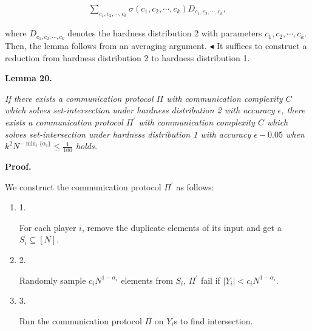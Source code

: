 \[\begin{gathered}
\sum_{c_{1},c_{2},\cdots,c_{k}}\sigma(c_{1},c_{2},\cdots,c_{k})D_{c_{1},c_{2},\cdots,c_{k}},
\end{gathered}\]


where $D_{c_{1},c_{2},\cdots,c_{k}}$ denotes the hardness distribution 2 with parameters $c_{1},c_{2},\cdots,c_{k}$. Then, the lemma follows from an averaging argument.
$\blacktriangleleft$
It suffices to construct a reduction from hardness distribution 2 to hardness distribution 1.\par





\par\medskip\noindent\textbf{
\textbf{Lemma 20}\textbf{.}
}\par



\emph{If there exists a communication protocol $\Pi$ with communication complexity $C$ which solves set-intersection under hardness distribution 2 with accuracy $\epsilon$, there exists a communication protocol $\Pi^{\prime}$ with communication complexity $C$ which solves set-intersection under hardness distribution 1 with accuracy $\epsilon-0.05$ when $k^{2}N^{-\min_{i}\{\alpha_{i}\}}\leq\frac{1}{100}$ holds.}\par







\par\medskip\noindent\textbf{Proof.}\par




We construct the communication protocol $\Pi^{\prime}$ as follows:\par


\begin{enumerate}


\item[] 
1. 


For each player $i$, remove the duplicate elements of its input and get a $S_{i}\subseteq[N]$.\par





\item[] 
2. 


Randomly sample $c_{i}N^{1-\alpha_{i}}$ elements from $S_{i}$, $\Pi^{\prime}$ fail if $|Y_{i}|<c_{i}N^{1-\alpha_{i}}$.\par





\item[] 
3. 


Run the communication protocol $\Pi$ on $Y_{i}$s to find intersection.\par





\end{enumerate}


